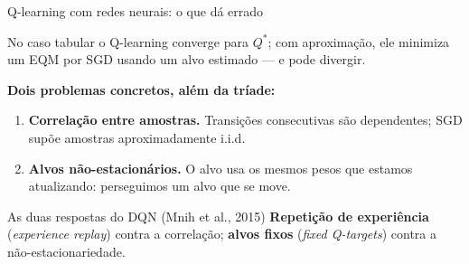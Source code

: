 \documentclass[aspectratio=169, 11pt]{beamer}
\newcommand{\Qstar}{Q^{*}}
\begin{document}
\begin{frame}{Q-learning com redes neurais: o que dá errado}

  {\small No caso tabular o Q-learning converge para $\Qstar$; com
  aproximação, ele minimiza um EQM por SGD usando um alvo estimado --- e
  pode divergir.}

  \begin{alertabox}
    \textbf{Dois problemas concretos, além da tríade:}
    \begin{enumerate}\setlength{\itemsep}{0.25ex}
      \item \textbf{Correlação entre amostras.} Transições consecutivas são
        dependentes; SGD supõe amostras aproximadamente i.i.d.
      \item \textbf{Alvos não-estacionários.} O alvo usa os mesmos pesos
        que estamos atualizando: perseguimos um alvo que se move.
    \end{enumerate}
  \end{alertabox}

  \begin{defbox}{As duas respostas do DQN \textnormal{(Mnih et al., 2015)}}
    \textbf{Repetição de experiência} (\emph{experience replay}) contra a
    correlação; \textbf{alvos fixos} (\emph{fixed Q-targets}) contra a
    não-estacionariedade.
  \end{defbox}
\end{frame}
\end{document}
